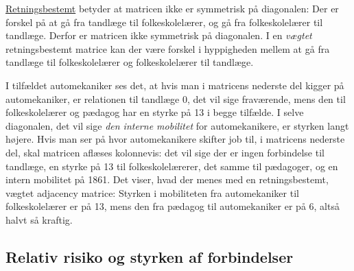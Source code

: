 \underline{Retningsbestemt} betyder at matricen ikke er symmetrisk på diagonalen: Der er forskel på at gå fra tandlæge til folkeskolelærer, og gå fra folkeskolelærer til tandlæge. Derfor er matricen ikke symmetrisk på diagonalen. I en \emph{vægtet} retningsbestemt matrice kan der være forskel i hyppigheden mellem at gå fra tandlæge til folkeskolelærer og folkeskolelærer til tandlæge. 


I tilfældet automekaniker ses det, at hvis man i matricens nederste del kigger på automekaniker, er relationen til tandlæge 0, det vil sige fraværende, mens den til folkeskolelærer og pædagog har en styrke på 13 i begge tilfælde. I selve diagonalen, det  vil sige \emph{den interne mobilitet} for automekanikere, er styrken langt højere. Hvis man ser på hvor automekanikere skifter job til, i matricens nederste del, skal matricen aflæses kolonnevis: det vil sige der er ingen forbindelse til tandlæge, en styrke på 13 til folkeskolelærerer, det samme til pædagoger, og en intern mobilitet på 1861. Det viser, hvad der menes med en retningsbestemt, vægtet adjacency matrice: Styrken i mobiliteten fra automekaniker til folkeskolelærer er på 13, mens den fra pædagog til automekaniker er på 6, altså halvt så kraftig.



\subsection{Relativ risiko og styrken af forbindelser \label{metode_relativrisiko}}


